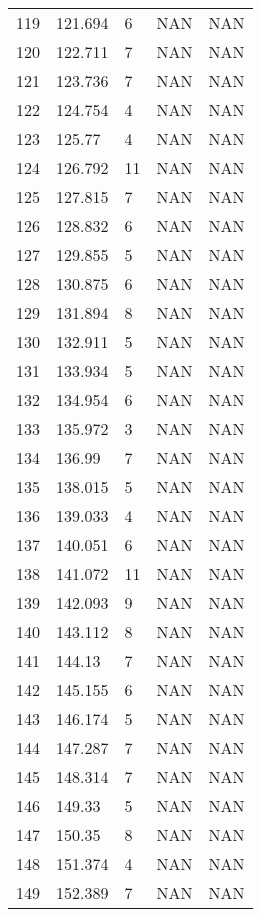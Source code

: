 \documentclass{article}
\begin{document}
\begin{longtable}{@{}lllll@{}}
				119 & 121.694 & 6     & NAN   & NAN   \\
				120 & 122.711 & 7     & NAN   & NAN   \\
				121 & 123.736 & 7     & NAN   & NAN   \\
				122 & 124.754 & 4     & NAN   & NAN   \\
				123 & 125.77  & 4     & NAN   & NAN   \\
				124 & 126.792 & 11    & NAN   & NAN   \\
				125 & 127.815 & 7     & NAN   & NAN   \\
				126 & 128.832 & 6     & NAN   & NAN   \\
				127 & 129.855 & 5     & NAN   & NAN   \\
				128 & 130.875 & 6     & NAN   & NAN   \\
				129 & 131.894 & 8     & NAN   & NAN   \\
				130 & 132.911 & 5     & NAN   & NAN   \\
				131 & 133.934 & 5     & NAN   & NAN   \\
				132 & 134.954 & 6     & NAN   & NAN   \\
				133 & 135.972 & 3     & NAN   & NAN   \\
				134 & 136.99  & 7     & NAN   & NAN   \\
				135 & 138.015 & 5     & NAN   & NAN   \\
				136 & 139.033 & 4     & NAN   & NAN   \\
				137 & 140.051 & 6     & NAN   & NAN   \\
				138 & 141.072 & 11    & NAN   & NAN   \\
				139 & 142.093 & 9     & NAN   & NAN   \\
				140 & 143.112 & 8     & NAN   & NAN   \\
				141 & 144.13  & 7     & NAN   & NAN   \\
				142 & 145.155 & 6     & NAN   & NAN   \\
				143 & 146.174 & 5     & NAN   & NAN   \\
				144 & 147.287 & 7     & NAN   & NAN   \\
				145 & 148.314 & 7     & NAN   & NAN   \\
				146 & 149.33  & 5     & NAN   & NAN   \\
				147 & 150.35  & 8     & NAN   & NAN   \\
				148 & 151.374 & 4     & NAN   & NAN   \\
				149 & 152.389 & 7     & NAN   & NAN   \\

\end{longtable}
\end{document}

